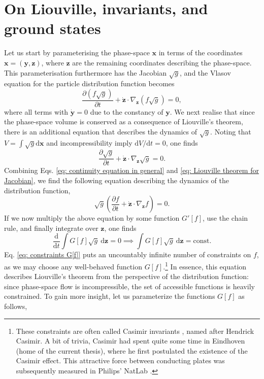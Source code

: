 \section{On Liouville, invariants, and ground states}
Let us start by parameterising the phase-space $\boldsymbol{x}$ in terms of the coordinates $\boldsymbol{x}=(\boldsymbol{y},\boldsymbol{z})$, where $\boldsymbol{z}$ are the remaining coordinates describing the phase-space. This parameterisation furthermore has the Jacobian $\sqrt{g}$, and the Vlasov equation for the particle distribution function becomes
\begin{equation}
    \frac{\partial (f\sqrt{g})}{\partial t} + \dot{\boldsymbol{z}} \cdot  \nabla_{\boldsymbol{z}} (f\sqrt{g}) = 0,
    \label{eq: continuity equation in general}
\end{equation}
where all terms with $\dot{\boldsymbol{y}}=0$ due to the constancy of $\boldsymbol{y}$. We next realise that since the phase-space volume is conserved as a consequence of Liouville's theorem, there is an additional equation that describes the dynamics of $\sqrt{g}$. Noting that $V = \int \sqrt{g} \mathrm{d}\boldsymbol{x}$ and incompressibility imply $\mathrm{d}V/\mathrm{d}t=0$, one finds
\begin{equation}
    \frac{\partial \sqrt{g}}{\partial t} + \dot{\boldsymbol{z}} \cdot \nabla_{\boldsymbol{z}} \sqrt{g} = 0.
    \label{eq: Liouville theorem for Jacobian}
\end{equation}
Combining Eqs. \eqref{eq: continuity equation in general} and \eqref{eq: Liouville theorem for Jacobian}, we find the following equation describing the dynamics of the distribution function,
\begin{equation}
    \sqrt{g} \left( \frac{\partial f}{\partial t} + \dot{\boldsymbol{z}} \cdot \nabla_{\boldsymbol{z}} f \right) = 0.
\end{equation}
If we now multiply the above equation by some function $G'[f]$, use the chain rule, and finally integrate over $\boldsymbol{z}$, one finds
\begin{equation}
    \frac{\mathrm{d}}{\mathrm{d} t} \int G[f] \sqrt{g} \: \mathrm{d} \boldsymbol{z} = 0 \implies \int G[f] \sqrt{g} \: \mathrm{d} \boldsymbol{z} = \mathrm{const.}
    \label{eq: constraints G[f]}
\end{equation}
Eq. \eqref{eq: constraints G[f]} puts an uncountably infinite number of constraints on $f$, as we may choose any well-behaved function $G[f]$.\footnote{These constraints are often called Casimir invariants \cite{ye1992action}, named after Hendrick Casimir. A bit of trivia, Casimir had spent quite some time in Eindhoven (home of the current thesis), where he first postulated the existence of the Casimir effect. This attractive force between conducting plates was subsequently measured in Philips' NatLab \cite{lambrecht2002casimir,sarlemijn2012physics}.} In essence, this equation describes Liouville's theorem from the perspective of the distribution function: since phase-space flow is incompressible, the set of accessible functions is heavily constrained. To gain more insight, let us parameterize the functions $G[f]$ as follows,
